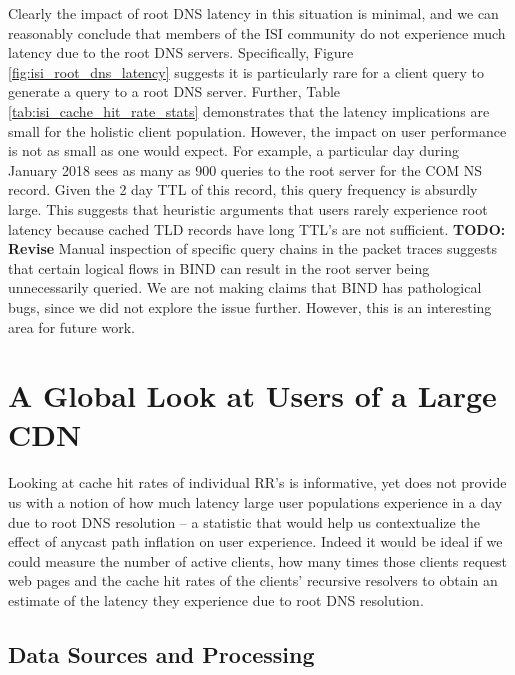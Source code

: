 \documentclass[sigconf,nonacm,10pt]{acmart}
\begin{document}
Clearly the impact of root DNS latency in this situation is minimal, and
we can reasonably conclude that members of the ISI community do not
experience much latency due to the root DNS servers. Specifically,
Figure \ref{fig:isi_root_dns_latency} suggests it is particularly rare
for a client query to generate a query to a root DNS server. Further,
Table \ref{tab:isi_cache_hit_rate_stats} demonstrates that the latency
implications are small for the holistic client population. However, the
impact on user performance is not as small as one would expect. For
example, a particular day during January 2018 sees as many as 900
queries to the root server for the COM NS record. Given the 2 day TTL of
this record, this query frequency is absurdly large. This suggests that
heuristic arguments that users rarely experience root latency because
cached TLD records have long TTL's are not sufficient. \break 
\textbf{TODO: Revise} Manual inspection of specific query chains in the
packet traces suggests that certain logical flows in BIND can result in
the root server being unnecessarily queried. We are not making claims
that BIND has pathological bugs, since we did not explore the issue
further. However, this is an interesting area for future work.

\section{A Global Look at Users of a Large
CDN}\label{a-global-look-at-users-of-a-large-cdn-1}

\label{sec:rr_global_look} Looking at cache hit rates of individual RR's
is informative, yet does not provide us with a notion of how much
latency large user populations experience in a day due to root DNS
resolution -- a statistic that would help us contextualize the effect of
anycast path inflation on user experience. Indeed it would be ideal if
we could measure the number of active clients, how many times those
clients request web pages and the cache hit rates of the clients'
recursive resolvers to obtain an estimate of the latency they experience
due to root DNS resolution.

\subsection{Data Sources and
Processing}\label{data-sources-and-processing-1}
\end{document}
